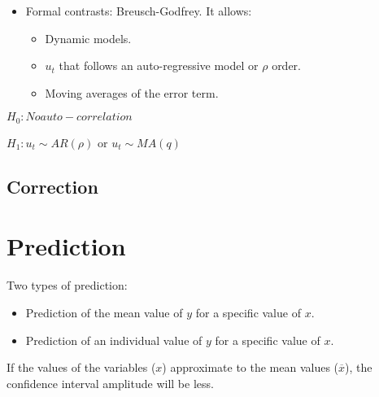 \documentclass[10pt,landscape]{article}
\begin{document}
\begin{multicols}{3}
\begin{itemize}[leftmargin=*]
\item Formal contrasts: Breusch-Godfrey. It allows:
\begin{itemize}[leftmargin=*]
\item Dynamic models.
\item $u_t$ that follows an auto-regressive model or $\rho$ order.
\item Moving averages of the error term.
\end{itemize}
\end{itemize}

$H_0: No auto-correlation$

$H_1: u_t \sim AR(\rho)$ or $u_t \sim MA(q)$

\subsection*{Correction}



\section*{Prediction}

Two types of prediction:

\begin{itemize}[leftmargin=*]
\item Prediction of the mean value of $y$ for a specific value of $x$.
\item Prediction of an individual value of $y$ for a specific value of $x$.
\end{itemize}

If the values of the variables ($x$) approximate to the mean values ($\overline{x}$), the confidence interval amplitude will be less. 





\end{multicols}
\end{document}
